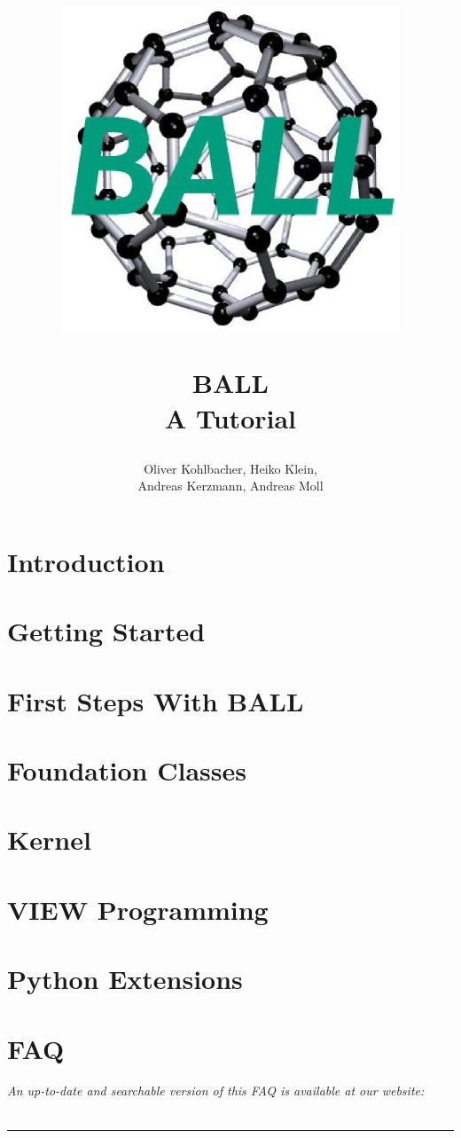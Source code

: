 \documentclass[12pt,twoside]{report}
\author{Oliver Kohlbacher, Heiko Klein,\\ Andreas Kerzmann, Andreas Moll}
\title{
  \begin{center}
    \includegraphics[width=10cm]{logo.eps}
  \end{center}
  \Huge BALL\\ 
  \Large A Tutorial
}
\begin{document}
\setcounter{page}{1}
\maketitle

\tableofcontents
\clearpage

\setcounter{page}{1}


\chapter{Introduction}
\label{chapter:introduction}



\chapter{Getting Started}
\label{chapter:getting-started}




\chapter{First Steps With BALL}
\label{chapter:first-steps}




\chapter{Foundation Classes}
\label{chapter:foundation-classes}




\chapter{Kernel}
\label{chapter:kernel}


\chapter{VIEW Programming}
\label{chapter:view-programming}


\chapter{Python Extensions}
\label{chapter:python}


\chapter{FAQ}
\label{chapter:faq}
\newpage
\noindent
{\it An up-to-date and searchable version of this FAQ is available at our website:\\
}\\
\hspace{1mm}
\rule{\textwidth}{0.1pt}
\hspace{3mm}



\newpage
{}
\small
\printindex
\normalsize

\renewcommand{\bibname}{References}


\end{document}
